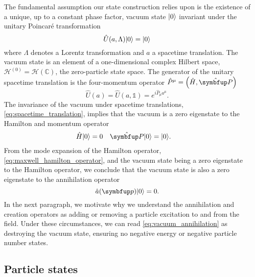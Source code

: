 The fundamental assumption our state construction relies upon is the existence of a unique, up to a constant phase factor, vacuum state $\lvert0\rangle$ invariant under the unitary Poincaré transformation~\cite[p.~97]{Streater2016}
\begin{equation}
	\hat{U}(a,\Lambda)
	\vacket
	=
	\vacket
	\label{eq:vacuum_invariance}
\end{equation}
where $\Lambda$ denotes a Lorentz transformation and $a$ a spacetime translation.
The vacuum state is an element of a one-dimensional complex Hilbert space, $\mathcal{H}^{(0)}=\mathcal{H}(\mathbb{C})$, the zero-particle state space.
The generator of the unitary spacetime translation is the four-momentum operator $\hat{P}^\mu=\left(\hat{H},\vu{P}\right)$~\cite[p.~28]{Haag2012}
\begin{equation}
	\hat{U}(a)
	=
	\hat{U}(a,\mathbb{1})
	=
	e^{i\hat{P}_\mu a^\mu}
	\label{eq:spacetime_translation}
	.
\end{equation}
The invariance of the vacuum under spacetime translations, \cref{eq:spacetime_translation}, implies that the vacuum is a zero eigenstate to the Hamilton and momentum operator
\begin{align}
	\hat{H}
	\vacket
	&=
	0
	&
	\vu{P}
	\vacket
	&=
	\vacket
	\label{eq:vacuum_energy_momentum}
	.	
\end{align}
From the mode expansion of the Hamilton operator, \cref{eq:maxwell_hamilton_operator}, and the vacuum state being a zero eigenstate to the Hamilton operator, we conclude that the vacuum state is also a zero eigenstate to the annihilation operator
\begin{equation}
	\hat{a}(\vb{p})
	\vacket
	=
	0
	\label{eq:vacuum_annihilation}
	.
\end{equation}
In the next paragraph, we motivate why we understand the annihilation and creation operators as adding or removing a particle excitation to and from the field.
Under these circumstances, we can read \cref{eq:vacuum_annihilation} as destroying the vacuum state, ensuring no negative energy or negative particle number states.

\subsection{Particle states}

